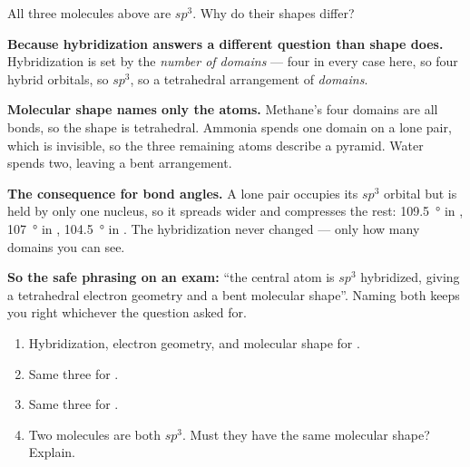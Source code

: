 \documentclass{apchem-worksheet}
\begin{document}
\begin{workedexample}
All three molecules above are $sp^{3}$. Why do their shapes differ?

\textbf{Because hybridization answers a different question than shape
does.} Hybridization is set by the \emph{number of domains} --- four in
every case here, so four hybrid orbitals, so $sp^{3}$, so a tetrahedral
arrangement of \emph{domains}.

\textbf{Molecular shape names only the atoms.} Methane's four domains
are all bonds, so the shape is tetrahedral. Ammonia spends one domain on
a lone pair, which is invisible, so the three remaining atoms describe a
pyramid. Water spends two, leaving a bent arrangement.

\textbf{The consequence for bond angles.} A lone pair occupies its
$sp^{3}$ orbital but is held by only one nucleus, so it spreads wider and
compresses the rest: \SI{109.5}{\degree} in ,
\SI{107}{\degree} in , \SI{104.5}{\degree} in . The
hybridization never changed --- only how many domains you can see.

\textbf{So the safe phrasing on an exam:} ``the central atom is $sp^{3}$
hybridized, giving a tetrahedral electron geometry and a bent molecular
shape''. Naming both keeps you right whichever the question asked for.
\end{workedexample}

\begin{yourturn}
\begin{enumerate}[leftmargin=*,itemsep=0.5em]
  \item Hybridization, electron geometry, and molecular shape for
        . \workspace[1.6cm]
  \item Same three for . \workspace[1.6cm]
  \item Same three for . \workspace[1.6cm]
  \item Two molecules are both $sp^{3}$. Must they have the same
        molecular shape? Explain. \workspace[1.6cm]
\end{enumerate}
\end{yourturn}
\end{document}
